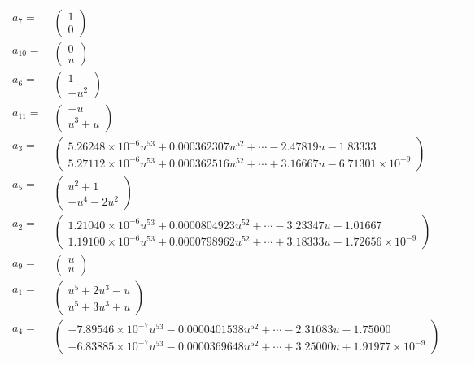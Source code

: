 \documentclass[1p]{elsarticle_modified}
\theoremstyle{definition}
\begin{document}
\begin{tabular}{m{7pt} m{180pt} m{7pt} m{180pt} }
\flushright $a_{7}=$&$\begin{pmatrix}1\\0\end{pmatrix}$ \\
\flushright $a_{10}=$&$\begin{pmatrix}0\\u\end{pmatrix}$ \\
\flushright $a_{6}=$&$\begin{pmatrix}1\\- u^2\end{pmatrix}$ \\
\flushright $a_{11}=$&$\begin{pmatrix}- u\\u^3+u\end{pmatrix}$ \\
\flushright $a_{3}=$&$\begin{pmatrix}5.26248\times10^{-6} u^{53}+0.000362307 u^{52}+\cdots-2.47819 u-1.83333\\5.27112\times10^{-6} u^{53}+0.000362516 u^{52}+\cdots+3.16667 u-6.71301\times10^{-9}\end{pmatrix}$ \\
\flushright $a_{5}=$&$\begin{pmatrix}u^2+1\\- u^4-2 u^2\end{pmatrix}$ \\
\flushright $a_{2}=$&$\begin{pmatrix}1.21040\times10^{-6} u^{53}+0.0000804923 u^{52}+\cdots-3.23347 u-1.01667\\1.19100\times10^{-6} u^{53}+0.0000798962 u^{52}+\cdots+3.18333 u-1.72656\times10^{-9}\end{pmatrix}$ \\
\flushright $a_{9}=$&$\begin{pmatrix}u\\u\end{pmatrix}$ \\
\flushright $a_{1}=$&$\begin{pmatrix}u^5+2 u^3- u\\u^5+3 u^3+u\end{pmatrix}$ \\
\flushright $a_{4}=$&$\begin{pmatrix}-7.89546\times10^{-7} u^{53}-0.0000401538 u^{52}+\cdots-2.31083 u-1.75000\\-6.83885\times10^{-7} u^{53}-0.0000369648 u^{52}+\cdots+3.25000 u+1.91977\times10^{-9}\end{pmatrix}$ \\

\end{tabular}
\end{document}
